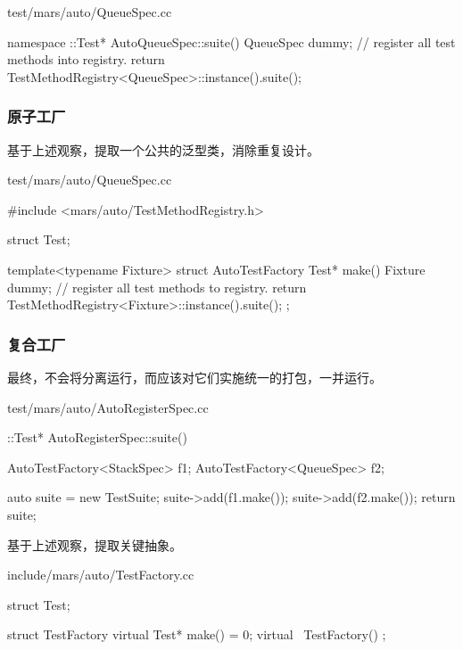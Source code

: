 \begin{content}
\begin{nodiff}{test/mars/auto/QueueSpec.cc}
 \begin{c++}
namespace {
  ::Test* AutoQueueSpec::suite() {
    QueueSpec dummy; // register all test methods into registry.
    return TestMethodRegistry<QueueSpec>::instance().suite();
  }
}
 \end{c++}
\end{nodiff}

\subsubsection{原子工厂}

基于上述观察，提取一个公共的泛型类，消除重复设计。

\begin{nodiff}{test/mars/auto/QueueSpec.cc}
 \begin{c++}
#include <mars/auto/TestMethodRegistry.h>

struct Test;

template<typename Fixture>
struct AutoTestFactory {
  Test* make() {
    Fixture dummy; // register all test methods to registry.
    return TestMethodRegistry<Fixture>::instance().suite();
  }
};
 \end{c++}
\end{nodiff}

\subsubsection{复合工厂}

最终，不会将分离运行，而应该对它们实施统一的打包，一并运行。

\begin{nodiff}{test/mars/auto/AutoRegisterSpec.cc}
 \begin{c++}
::Test* AutoRegisterSpec::suite() {
  AutoTestFactory<StackSpec> f1;
  AutoTestFactory<QueueSpec> f2;

  auto suite = new TestSuite;
  suite->add(f1.make());
  suite->add(f2.make());
  return suite;
}
 \end{c++}
\end{nodiff}

基于上述观察，提取关键抽象。

\begin{nodiff}{include/mars/auto/TestFactory.cc}
 \begin{c++}
struct Test;

struct TestFactory {
  virtual Test* make() = 0;
  virtual ~TestFactory() {}
};
 \end{c++}
\end{nodiff}


\end{content}
